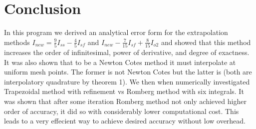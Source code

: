 \documentclass[12pt]{article}
\theoremstyle{remark}
\begin{document}
\newpage

\section{Conclusion}

In this program we derived an analytical error form for the extrapolation methods $I_{new} = \frac{9}{5}I_{ss} - \frac{4}{5}I_{sf}$ and $I_{new} - \frac{7}{15}I_{sf} + \frac{8}{15}I_{o2}$ and showed that this method increases the order of infinitesimal, power of derivative, and degree of exactness. It was also shown that to be a Newton Cotes method it must interpolate at uniform mesh points. The former is not Newton Cotes but the latter is (both are interpolatory quadrature by theorem 1). We then when numerically investigated Trapezoidal method with refinement vs Romberg method with six integrals. It was shown that after some iteration Romberg method not only achieved higher order of accuracy, it did so with considerably lower computational cost. This leads to a very effecient way to achieve desired accuracy without low overhead. 
\end{document}
